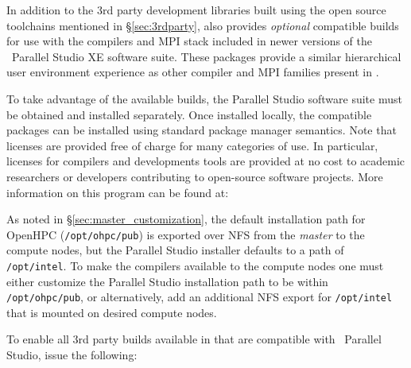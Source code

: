 In addition to the 3rd party development libraries built using the open source
toolchains mentioned in \S\ref{sec:3rdparty}, \OHPC{} also provides {\em
  optional} compatible builds for use with the compilers and MPI stack included
in newer versions of the \IntelR{}~Parallel Studio XE software suite.  These
packages provide a similar hierarchical user
environment experience as other compiler and MPI families present in \OHPC{}.

To take advantage of the available builds, the Parallel Studio software suite
must be obtained and installed separately. Once installed locally, the \OHPC{}
compatible packages can be installed using standard package manager semantics.
Note that licenses are provided free of charge for many categories of use. In
particular, licenses for compilers and developments tools are provided at no
cost to academic researchers or developers contributing to open-source software
projects. More information on this program can be found at:

\begin{center}
  \href{https://software.intel.com/en-us/qualify-for-free-software}
       {\color{blue}{https://software.intel.com/en-us/qualify-for-free-software}}
\end{center}

\begin{center}
\begin{tcolorbox}[]
As noted in \S\ref{sec:master_customization}, the default installation path for
OpenHPC (\texttt{/opt/ohpc/pub}) is exported over NFS from the {\em master} to the 
compute nodes, but the Parallel Studio installer defaults to a path of 
\texttt{/opt/intel}. To make the \IntelR{} compilers available to the compute 
nodes one must either customize the Parallel Studio installation path to be 
within \texttt{/opt/ohpc/pub}, or alternatively, add an additional NFS export
for \texttt{/opt/intel} that is mounted on desired compute nodes.
\end{tcolorbox}
\end{center}

\noindent To enable all 3rd party builds available in \OHPC{} that are compatible with
\IntelR{}~Parallel Studio, issue the following:

